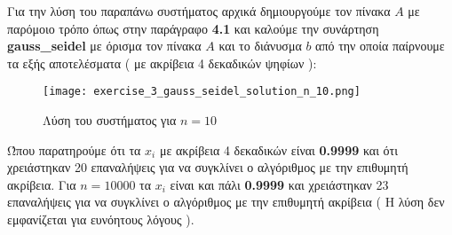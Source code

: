 \documentclass[First Project.tex]{subfiles}
\begin{document}
Για την λύση του παραπάνω συστήματος αρχικά δημιουργούμε τον πίνακα $Α$ με παρόμοιο τρόπο όπως στην παράγραφο \textbf{4.1} και καλούμε την 
συνάρτηση \textlatin{\textbf{gauss\_seidel}} με όρισμα τον πίνακα $Α$ και το διάνυσμα $b$ από την οποία παίρνουμε τα εξής αποτελέσματα ( με 
ακρίβεια 4 δεκαδικών ψηφίων ):
\begin{figure}[h!]
    \centering
    \captionsetup{justification=centering}
    \begin{center}
        \texttt{[image: exercise\_3\_gauss\_seidel\_solution\_n\_10.png]}    
        \caption{ Λύση του συστήματος για $n=10$ }
    \end{center}
\end{figure} 

Ώπου παρατηρούμε ότι τα $x_{i}$ με ακρίβεια 4 δεκαδικών είναι \textbf{0.9999} και ότι χρειάστηκαν 20 επαναλήψεις για να συγκλίνει
ο αλγόριθμος με την επιθυμητή ακρίβεια. Για $n = 10000$ τα $x_{i}$ είναι και πάλι \textbf{0.9999} και χρειάστηκαν 23 επαναλήψεις για να 
συγκλίνει ο αλγόριθμος με την επιθυμητή ακρίβεια ( Η λύση δεν εμφανίζεται για ευνόητους λόγους ).
\newpage
\end{document}
